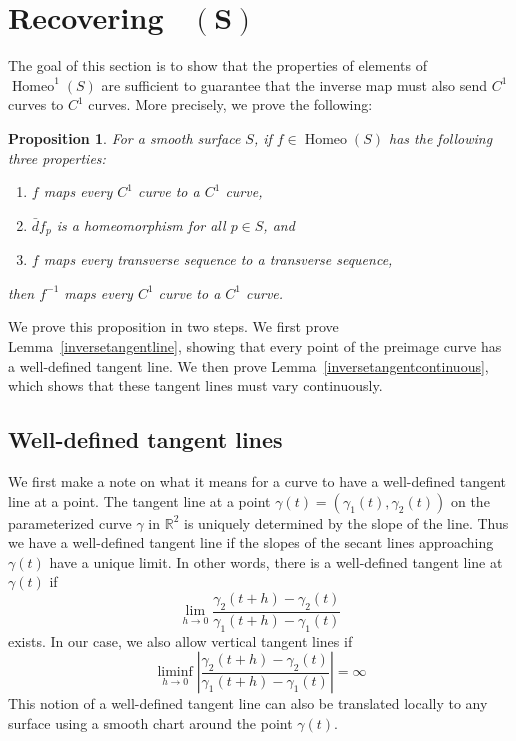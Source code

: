 \documentclass[sn-mathphys-num]{sn-jnl}%
\theoremstyle{thmstyleone}%
\newtheorem{prop}[theorem]{Proposition}%
\theoremstyle{thmstyletwo}%
\theoremstyle{thmstylethree}%
\DeclareMathOperator{\homeo}{Homeo}
\DeclareMathOperator{\bthomeo}{\textbf{Homeo}^{\textbf{1}}}
\begin{document}
\section{Recovering $\bthomeo(\mathbf{S})$}\label{sectionreverse}

The goal of this section is to show that the properties of elements of $\homeo^1(S)$ are sufficient to guarantee that the inverse map must also send $C^1$ curves to $C^1$ curves. More precisely, we prove the following: 

\begin{prop}\label{propthm2reverse}
For a smooth surface $S$, if $f \in \homeo(S)$ has the following three properties:
\begin{enumerate}[noitemsep,topsep=0pt, label=$(\alph*)$]
\item $f$ maps every $C^1$ curve to a $C^1$ curve, 
\item $\bar{d}f_p$ is a homeomorphism for all $p \in S$, and
\item $f$ maps every transverse sequence to a transverse sequence, 
\end{enumerate}
then $f^{-1}$ maps every $C^1$ curve to a $C^1$ curve. 
\end{prop}


We prove this proposition in two steps. We first prove Lemma~\ref{inversetangentline}, showing that every point of the preimage curve has a well-defined tangent line.  We then prove Lemma~\ref{inversetangentcontinuous},  which shows that these tangent lines must vary continuously.

\subsection{Well-defined tangent lines}


We first make a note on what it means for a curve to have a well-defined tangent line at a point.  The tangent line at a point $\gamma(t) = (\gamma_1(t), \gamma_2(t))$ on the parameterized curve $\gamma$ in $\mathbb{R}^2$ is uniquely determined by the slope of the line.  Thus we have a well-defined tangent line if the slopes of the secant lines approaching $\gamma(t)$ have a unique limit.  In other words, there is a well-defined tangent line at $\gamma(t)$ if 
$$\lim_{h \rightarrow 0} \frac{\gamma_2(t+h) - \gamma_2(t)}{\gamma_1(t+h) - \gamma_1(t)}$$ exists.  In our case, we also allow vertical tangent lines if 
$$\liminf_{h \rightarrow 0} \left|\frac{\gamma_2(t+h) - \gamma_2(t)}{\gamma_1(t+h) - \gamma_1(t)} \right| = \infty$$ This notion of a well-defined tangent line can also be translated locally to any surface using a smooth chart around the point $\gamma(t)$. 
\end{document}

